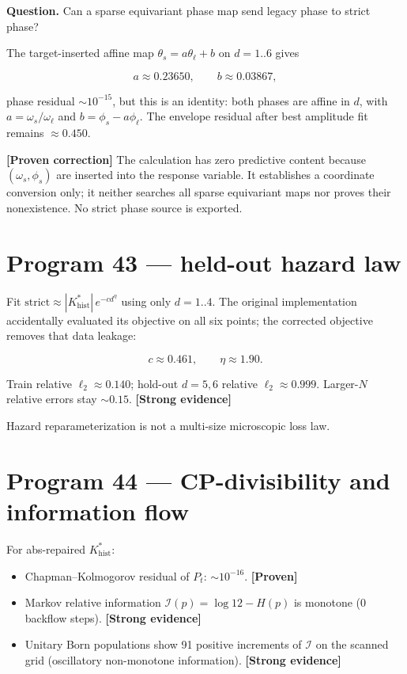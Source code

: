 \documentclass[11pt,a4paper,openany]{report}
\newcommand{\statusProven}{\textcolor{fingreen}{[Proven]}}
\newcommand{\statusStrong}{\textcolor{finblue}{[Strong evidence]}}
\begin{document}
\textbf{Question.} Can a sparse equivariant phase map send legacy phase to strict phase?

The target-inserted affine map \(\theta_s=a\theta_\ell+b\) on \(d=1..6\) gives

\[
a\approx 0.23650,\qquad b\approx 0.03867,
\]

phase residual \(\sim 10^{-15}\), but this is an identity: both phases are affine in \(d\), with \(a=\omega_s/\omega_\ell\) and \(b=\phi_s-a\phi_\ell\). The envelope residual after best amplitude fit remains \(\approx 0.450\).

\textbf{[Proven correction]} The calculation has zero predictive content because \((\omega_s,\phi_s)\) are inserted into the response variable. It establishes a coordinate conversion only; it neither searches all sparse equivariant maps nor proves their nonexistence. No strict phase source is exported.

\section{Program 43 — held-out hazard law}

Fit \(\mathrm{strict}\approx |K^*_{\mathrm{hist}}|\,e^{-c d^\eta}\) using only \(d=1..4\). The original implementation accidentally evaluated its objective on all six points; the corrected objective removes that data leakage:

\[
c\approx 0.461,\qquad \eta\approx 1.90.
\]

Train relative \(\ell_2\approx 0.140\); hold-out \(d=5,6\) relative \(\ell_2\approx 0.999\). Larger-\(N\) relative errors stay \(\sim 0.15\). \textbf{\statusStrong{}}

Hazard reparameterization is not a multi-size microscopic loss law.

\section{Program 44 — CP-divisibility and information flow}

For abs-repaired \(K^*_{\mathrm{hist}}\):

\begin{itemize}
\item 
Chapman–Kolmogorov residual of \(P_t\): \(\sim 10^{-16}\). \textbf{\statusProven{}}

\item 
Markov relative information \(\mathcal I(p)=\log 12-H(p)\) is monotone (0 backflow steps). \textbf{\statusStrong{}}

\item 
Unitary Born populations show 91 positive increments of \(\mathcal I\) on the scanned grid (oscillatory non-monotone information). \textbf{\statusStrong{}}

\end{itemize}
\end{document}
